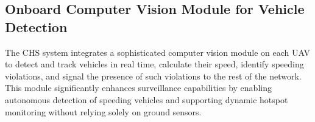 







\subsection{Onboard Computer Vision Module for Vehicle Detection}

The CHS system integrates a sophisticated computer vision module on each UAV to detect and track vehicles in real time, calculate their speed, identify speeding violations, and signal the presence of such violations to the rest of the network. This module significantly enhances surveillance capabilities by enabling autonomous detection of speeding vehicles and supporting dynamic hotspot monitoring without relying solely on ground sensors.

